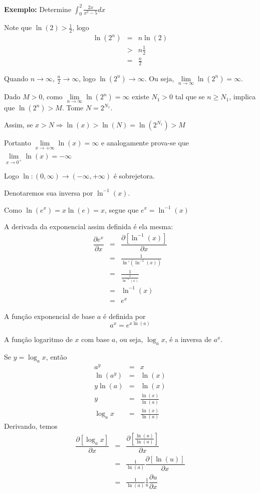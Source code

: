 \documentclass[oneside,a4paper,12pt]{article}
\begin{document}
{\bf Exemplo: } Determine $\int_{0}^{2}\frac{2x}{x^2 - 5}dx$

\vspace{300pt}

Note que $\ln(2) > \frac{1}{2}$, logo
\begin{eqnarray*}
\ln(2^n) & = & n \ln(2) \\
& > & n \frac{1}{2} \\
& = & \frac{n}{2}
\end{eqnarray*}

Quando $n \rightarrow \infty$, $\frac{n}{2} \rightarrow \infty$, logo $\ln(2^n) \rightarrow \infty$. Ou seja, $\lim\limits_{n \rightarrow \infty}\ln(2^n) = \infty$.

Dado $M > 0$, como $\lim\limits_{n \rightarrow \infty}\ln(2^n) = \infty$ existe $N_1 > 0$ tal que se $n \geq N_1$, implica que $\ln(2^n) > M$. Tome $N = 2^{N_1}$.

Assim, se $x > N \Rightarrow \ln(x) > \ln(N) = \ln(2^{N_1}) > M$

Portanto $\lim\limits_{x \rightarrow + \infty}\ln(x) = \infty$ e analogamente prova-se que $\lim\limits_{x \rightarrow 0^{+}}\ln(x) = -\infty$

Logo $\ln:(0,\infty) \rightarrow (-\infty,+\infty)$ é sobrejetora.

Denotaremos sua inversa por $\ln^{-1}(x)$.

Como $\ln(e^x) = x\ln(e) = x$, segue que $e^x = \ln^{-1}(x)$

A derivada da exponencial assim definida é ela mesma:
\begin{eqnarray*}
\dfrac{\partial e^x}{\partial x} & = & \dfrac{\partial [\ln^{-1}(x)]}{\partial x} \\
& = & \frac{1}{\ln'(\ln^{-1}(x))} \\
& = & \frac{1}{\frac{1}{\ln^{-1}(x)}} \\
& = & \ln^{-1}(x) \\
& = & e^x
\end{eqnarray*}

A função exponencial de base $a$ é definida por
$$a^x = e^{x\ln(a)}$$

A função logaritmo de $x$ com base $a$, ou seja, $\log_{a}x$, é a inversa de $a^x$.

Se $y = \log_{a}x$, então
\begin{eqnarray*}
a^y & = & x \\
\ln(a^y) & = & \ln(x) \\
y\ln(a) & = & \ln(x) \\
y & = & \frac{\ln(x)}{\ln(a)} \\
\log_{a}x & = & \frac{\ln(x)}{\ln(a)}
\end{eqnarray*}
Derivando, temos
\begin{eqnarray*}
\dfrac{\partial [\log_{a}x]}{\partial x} & = & \dfrac{\partial [\frac{\ln(u)}{\ln(a)}]}{\partial x} \\
& = & \frac{1}{\ln(a)}\dfrac{\partial [\ln(u)]}{\partial x} \\
& = & \frac{1}{\ln(a)}\frac{1}{u}\dfrac{\partial u}{\partial x}
\end{eqnarray*}
\end{document}
